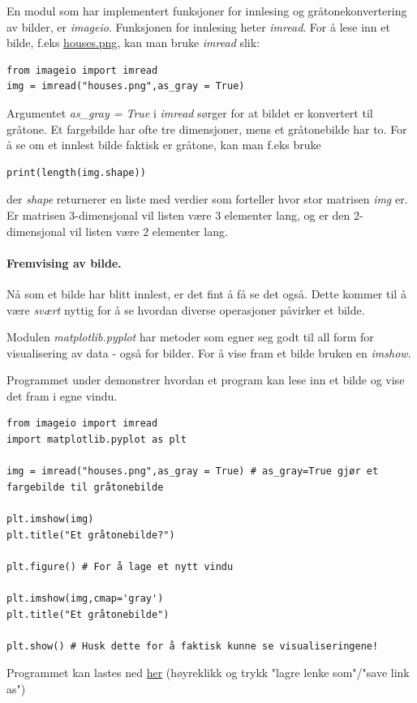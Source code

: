 \documentclass[%
oneside,                 %
final,                   %
10pt]{article}
\begin{document}
En modul som har implementert funksjoner for innlesing og gråtonekonvertering av bilder, er \emph{imageio}.
Funksjonen for innlesing heter \emph{imread}. For å lese inn et bilde, f.eks \href{{https://github.com/krisbhei/INF2310/raw/master/Programmering/Python/houses.png}}{houses.png}, kan man bruke \emph{imread} slik:
\begin{verbatim}
from imageio import imread
img = imread("houses.png",as_gray = True)
\end{verbatim}

Argumentet \emph{as\_gray = True} i \emph{imread} sørger for at bildet er konvertert til gråtone. Et fargebilde har ofte tre dimensjoner, mens et gråtonebilde har to.
For å se om et innlest bilde faktisk er gråtone, kan man f.eks bruke
\begin{verbatim}
print(length(img.shape))
\end{verbatim}
der \emph{shape} returnerer en liste med verdier som forteller hvor stor matrisen \emph{img} er. Er matrisen 3-dimensjonal vil listen være 3 elementer lang, og er den 2-dimensjonal vil listen være 2 elementer lang.

\paragraph{Fremvising av bilde.}
Nå som et bilde har blitt innlest, er det fint å få se det også. Dette kommer til å være \emph{svært} nyttig for å se hvordan diverse operasjoner påvirker et bilde.

Modulen \emph{matplotlib.pyplot} har metoder som egner seg godt til all form for visualisering av data - også for bilder. For å vise fram et bilde bruken en \emph{imshow}.

Programmet under demonstrer hvordan et program kan lese inn et bilde og vise det fram i egne vindu.
\begin{verbatim}
from imageio import imread
import matplotlib.pyplot as plt

img = imread("houses.png",as_gray = True) # as_gray=True gjør et fargebilde til gråtonebilde

plt.imshow(img)
plt.title("Et gråtonebilde?")

plt.figure() # For å lage et nytt vindu

plt.imshow(img,cmap='gray')
plt.title("Et gråtonebilde")

plt.show() # Husk dette for å faktisk kunne se visualiseringene!
\end{verbatim}
Programmet kan lastes ned \href{{https://github.com/krisbhei/INF2310/raw/master/Programmering/Python/fremvising.py}}{her} (høyreklikk og trykk "lagre lenke som"/"save link as")
\end{document}

